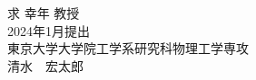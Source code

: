 \begin{titlepage}
求 幸年 教授\\[2cm]
{\Large 2024年1月提出}\\[3cm]
{\LARGE 東京大学大学院工学系研究科物理工学専攻}\\[1.5cm]
{\Large 清水　宏太郎}\\[0.5cm]
\vfill
\afterpage{\blankpage}
\end{titlepage}
